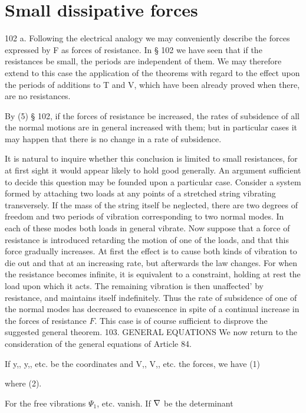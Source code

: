 \section{Small dissipative forces}\label{sect:102a} 102 a.
Following the electrical analogy we may conveniently
describe the forces expressed by F as forces of resistance. In
§ 102 we have seen that if the resistances be small, the periods
are independent of them. We may therefore extend to this case
the application of the theorems with regard to the effect upon
the periods of additions to T and V, which have been already
proved when there, are no resistances.

By (5) § 102, if the forces of resistance be increased, the rates
of subsidence of all the normal motions are in general increased
with them; but in particular cases it may happen that there
is no change in a rate of subsidence.

It is natural to inquire whether this conclusion is limited to
small resistances, for at first sight it would appear likely to hold
good generally. An argument sufficient to decide this question
may be founded upon a particular case. Consider a system formed
by attaching two loads at any points of a stretched string vibrating
transversely. If the mass of the string itself be neglected, there
are two degrees of freedom and two periods of vibration corresponding
to two normal modes. In each of these modes both loads
in general vibrate. Now suppose that a force of resistance is
introduced retarding the motion of one of the loads, and that this
force gradually increases. At first the effect is to cause both kinds
of vibration to die out and that at an increasing rate, but afterwards
the law changes. For when the resistance becomes infinite,
it is equivalent to a constraint, holding at rest the load upon which
it acts. The remaining vibration is then unaffected' by resistance,
and maintains itself indefinitely. Thus the rate of subsidence of
one of the normal modes has decreased to evanescence in spite of a
continual increase in the forces of resistance \(F\).  This case is of
course sufficient to disprove the suggested general theorem.
103.  GENERAL EQUATIONS
We now return to the consideration of the general equations of Article 84.

If y,, y,, etc. be the coordinates and V,, V,, etc. the forces, we have (1)

where (2).

For the free vibrations \(\Psi_1\), etc. vanish. If \(\nabla\) be the determinant


